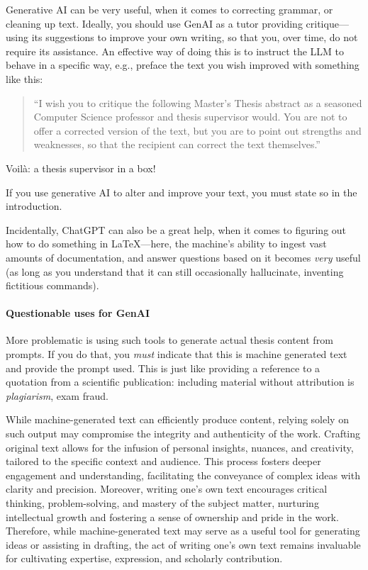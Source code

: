 Generative AI can be very useful, when it comes to correcting grammar, or cleaning up text. Ideally, you should use GenAI as a tutor providing critique---using its suggestions to improve your own writing, so that you, over time, do not require its assistance. An effective way of doing this is to instruct the \ac{LLM} to behave in a specific way, e.g., preface the text you wish improved with something like this:

\begin{quotation}
  ``I wish you to critique the following Master's Thesis abstract as a seasoned Computer Science professor and thesis supervisor would. You are not to offer a corrected version of the text, but you are to point out strengths and weaknesses, so that the recipient can correct the text themselves.''
\end{quotation}

Voilà: a thesis supervisor in a box!

If you use generative AI to alter and improve your text, you must state so in the introduction.



Incidentally, ChatGPT can also be a great help, when it comes to figuring out how to do something in \LaTeX---here, the machine's ability to ingest vast amounts of documentation, and answer questions based on it becomes \emph{very} useful (as long as you understand that it can still occasionally hallucinate, inventing fictitious commands). 

\paragraph{Questionable uses for GenAI} More problematic is using such tools to generate actual thesis content from prompts. If you do that, you \emph{must} indicate that this is machine generated text and provide the prompt used. This is just like providing a reference to a quotation from a scientific publication: including material without attribution is \emph{plagiarism}, \ie exam fraud.


\begin{displayquote}\small
  While machine-generated text can efficiently produce content, relying solely on such output may compromise the integrity and authenticity of the work. Crafting original text allows for the infusion of personal insights, nuances, and creativity, tailored to the specific context and audience. This process fosters deeper engagement and understanding, facilitating the conveyance of complex ideas with clarity and precision. Moreover, writing one's own text encourages critical thinking, problem-solving, and mastery of the subject matter, nurturing intellectual growth and fostering a sense of ownership and pride in the work. Therefore, while machine-generated text may serve as a useful tool for generating ideas or assisting in drafting, the act of writing one's own text remains invaluable for cultivating expertise, expression, and scholarly contribution.
\end{displayquote}


